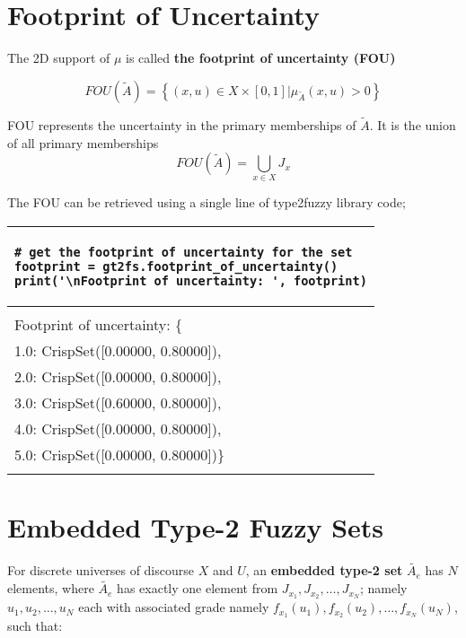 \documentclass[]{article}
\begin{document}
\section{Footprint of Uncertainty}

The 2D support of $\mu$ is called \textbf{the footprint of uncertainty (FOU)}

\begin{equation}
FOU(\tilde{A})= \left\lbrace  (x,u) \in X \times [0,1]  | \mu_{\tilde{A}}(x,u) > 0 \right\rbrace 
\end{equation}

FOU represents the uncertainty in the primary memberships of $\tilde{A}$. It is the union of all primary memberships 
\begin{equation}
FOU(\tilde{A}) = \bigcup\limits_{x\in X} J_{x}
\end{equation}

\bigskip

The FOU can be retrieved using a single line of type2fuzzy library code;

\bigskip

\begin{tabular}{|l|}
\hline 
\lstset{language=Python}
\lstset{basicstyle=\scriptsize}
\begin{lstlisting}
# get the footprint of uncertainty for the set
footprint = gt2fs.footprint_of_uncertainty()
print('\nFootprint of uncertainty: ', footprint)
\end{lstlisting}
\\
\hline
\\
{\small Footprint of uncertainty:  \{}\\
{\small 1.0: CrispSet([0.00000, 0.80000]), }\\
{\small 2.0: CrispSet([0.00000, 0.80000]), }\\
{\small 3.0: CrispSet([0.60000, 0.80000]), }\\
{\small 4.0: CrispSet([0.00000, 0.80000]), }\\
{\small 5.0: CrispSet([0.00000, 0.80000])\}}\\
\\
\hline 
\end{tabular} 


\section{Embedded Type-2 Fuzzy Sets}

For discrete universes of discourse $X$ and $U$, an \textbf{embedded type-2 set} $\tilde{A_e}$ has $N$ elements, where $\tilde{A_e}$ has exactly one element from $J_{x_{1}}, J_{x_{2}}, \dots , J_{x_{N}}$; namely $u_{1}, u_{2}, \dots , u_{N}$ each with associated grade namely $f_{x_{1}}(u_1), f_{x_{2}}(u_2), \dots , f_{x_{N}}(u_N)$, such that:
\end{document}
